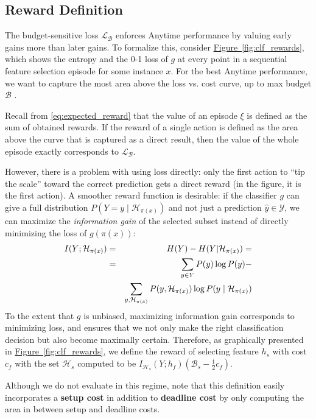 \subsection{Reward Definition}\label{sec:clf_reward}



The budget-sensitive loss $\mathcal{L}_\mathcal{B}$ enforces Anytime performance by valuing early gains more than later gains.
To formalize this, consider \hyperref[fig:clf_rewards]{Figure~\ref*{fig:clf_rewards}}, which shows the entropy and the 0-1 loss of $g$ at every point in a sequential feature selection episode for some instance $x$.
For the best Anytime performance, we want to capture the most area above the loss vs. cost curve, up to max budget $\mathcal{B}$ \parencite{Karayev-NIPS-2012}.

Recall from \eqref{eq:expected_reward} that the value of an episode $\xi$ is defined as the sum of obtained rewards.
If the reward of a single action is defined as the area above the curve that is captured as a direct result, then the value of the whole episode exactly corresponds to $\mathcal{L}_\mathcal{B}$.

However, there is a problem with using loss directly: only the first action to ``tip the scale'' toward the correct prediction gets a direct reward (in the figure, it is the first action).  A smoother reward function is desirable:
if the classifier $g$ can give a full distribution $P(Y = y \mid \mathcal{H}_{\pi(x)})$ and not just a prediction $\hat{y} \in \mathcal{Y}$, we can maximize the \emph{information gain} of the selected subset instead of directly minimizing the loss of $g(\pi(x))$:
\begin{eqnarray}
I(Y; \mathcal{H}_{\pi(x)}) &=& H(Y) - H(Y | \mathcal{H}_{\pi(x)}) = \\ \notag
&=& \sum_{y \in Y} P(y) \log P(y) -  \\ \notag
&&\sum_{y, \mathcal{H}_{\pi(x)}} P(y, \mathcal{H}_{\pi(x)}) \log P(y \mid \mathcal{H}_{\pi(x)})
\end{eqnarray}
To the extent that $g$ is unbiased, maximizing information gain corresponds to minimizing loss, and ensures that we not only make the right classification decision but also become maximally certain.
Therefore, as graphically presented in \hyperref[fig:clf_rewards]{Figure~\ref*{fig:clf_rewards}}, we define the reward of selecting feature $h_s$ with cost $c_f$ with the set $\mathcal{H}_s$ computed to be $I_{\mathcal{H}_s}(Y; h_f) (\mathcal{B}_s - \frac{1}{2}c_f)$.


Although we do not evaluate in this regime, note that this definition easily incorporates a \textbf{setup cost} in addition to \textbf{deadline cost} by only computing the area in between setup and deadline costs.
